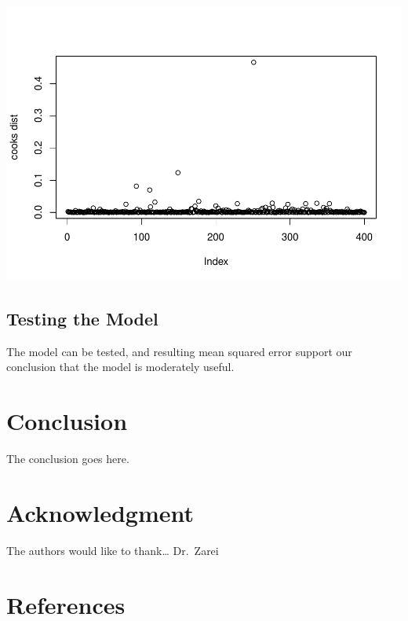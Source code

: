 \documentclass[conference,final,]{IEEEtran}
\makeatletter
\def\maxwidth{\ifdim\Gin@nat@width>\linewidth\linewidth
\else\Gin@nat@width\fi}
\let\Oldincludegraphics\includegraphics
\renewcommand{\includegraphics}[1]{\Oldincludegraphics[width=\maxwidth]{#1}}
\makeatother
\begin{document}
\includegraphics{forest_fires_files/figure-latex/unnamed-chunk-8-1.pdf}

\hypertarget{testing-the-model}{%
\subsection{Testing the Model}\label{testing-the-model}}

The model can be tested, and resulting mean squared error support our
conclusion that the model is moderately useful.

\hypertarget{conclusion}{%
\section{Conclusion}\label{conclusion}}

The conclusion goes here.

\hypertarget{acknowledgment}{%
\section{Acknowledgment}\label{acknowledgment}}

The authors would like to thank\ldots{} Dr.~Zarei

\hypertarget{references}{%
\section{References}\label{references}}

\newpage
\end{document}
